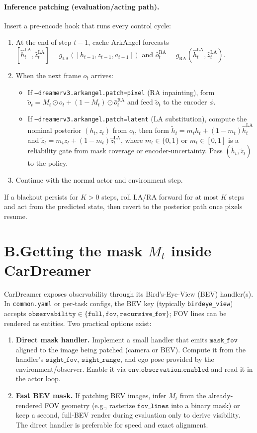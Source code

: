 \documentclass[11pt]{article}
\newcommand{\code}[1]{\texttt{#1}}
\begin{document}
\paragraph{Inference patching (evaluation/acting path).}
Insert a pre-encode hook that runs every control cycle:
\begin{enumerate}
\item At the end of step \(t{-}1\), cache ArkAngel forecasts
\(
[\hat h_t^{\mathrm{LA}},\hat z_t^{\mathrm{LA}}]=g_{\mathrm{LA}}([h_{t-1},z_{t-1},a_{t-1}])
\)
and
\(
\hat o_t^{\mathrm{RA}}=g_{\mathrm{RA}}(\hat h_t^{\mathrm{LA}},\hat z_t^{\mathrm{LA}}).
\)
\item When the next frame \(o_t\) arrives:
\begin{itemize}
\item If \code{--dreamerv3.arkangel.patch=pixel} (RA inpainting), form \(\tilde o_t=M_t\odot o_t+(1-M_t)\odot \hat o_t^{\mathrm{RA}}\) and feed \(\tilde o_t\) to the encoder \(\phi\).
\item If \code{--dreamerv3.arkangel.patch=latent} (LA substitution), compute the nominal posterior \((h_t,z_t)\) from \(o_t\), then form \(\tilde h_t=m_t h_t+(1-m_t)\hat h_t^{\mathrm{LA}}\) and \(\tilde z_t=m_t z_t+(1-m_t)\hat z_t^{\mathrm{LA}}\), where \(m_t\in\{0,1\}\) or \(m_t\in[0,1]\) is a reliability gate from mask coverage or encoder-uncertainty. Pass \((\tilde h_t,\tilde z_t)\) to the policy.
\end{itemize}
\item Continue with the normal actor and environment step.
\end{enumerate}
If a blackout persists for \(K>0\) steps, roll LA/RA forward for at most \(K\) steps and act from the predicted state, then revert to the posterior path once pixels resume.

\section*{B.\quad Getting the mask \(M_t\) inside CarDreamer}
CarDreamer exposes observability through its Bird’s-Eye-View (BEV) handler(s). In \code{common.yaml} or per-task configs, the BEV key (typically \code{birdeye\_view}) accepts \(\texttt{observability}\in\{\texttt{full},\texttt{fov},\texttt{recursive\_fov}\}\); FOV lines can be rendered as entities. Two practical options exist:
\begin{enumerate}
\item \textbf{Direct mask handler.} Implement a small handler that emits \(\texttt{mask\_fov}\) aligned to the image being patched (camera or BEV). Compute it from the handler’s \(\texttt{sight\_fov}\), \(\texttt{sight\_range}\), and ego pose provided by the environment/observer. Enable it via \(\texttt{env.observation.enabled}\) and read it in the actor loop.
\item \textbf{Fast BEV mask.} If patching BEV images, infer \(M_t\) from the already-rendered FOV geometry (e.g., rasterize \(\texttt{fov\_lines}\) into a binary mask) or keep a second, full-BEV render during evaluation only to derive visibility. The direct handler is preferable for speed and exact alignment.
\end{enumerate}
\end{document}
